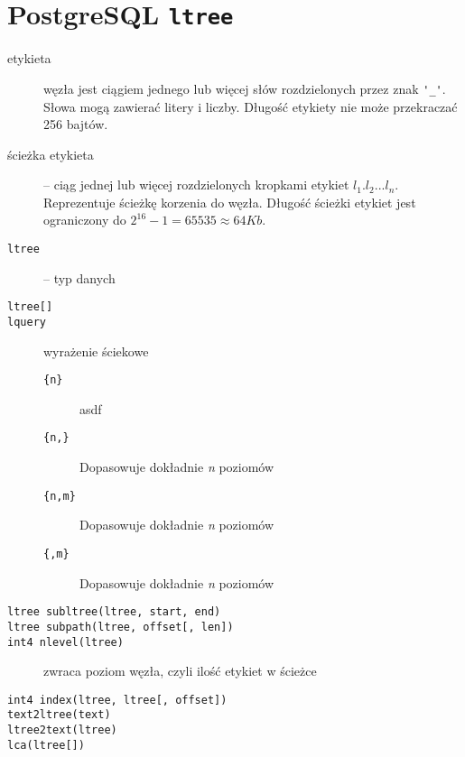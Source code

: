 \section{PostgreSQL \texttt{ltree}}



\begin{description}
    \item[etykieta]  węzła jest ciągiem jednego lub więcej słów rozdzielonych przez znak \verb|'_'|. 
        Słowa mogą zawierać litery i liczby.
        Długość etykiety nie może przekraczać 256 bajtów. 
    \item[ścieżka etykieta]
         -- ciąg jednej lub więcej rozdzielonych kropkami etykiet $l_1.l_2...l_n$. 
        Reprezentuje ścieżkę korzenia do węzła. 
        Długość ścieżki etykiet jest ograniczony do $2^{16} - 1 = 65535 \approx 64 Kb$. 
          

\end{description}


\begin{description}
    \item[\texttt{ltree}] -- typ danych
    \item[\texttt{ltree[]}]
    \item[\texttt{lquery}] wyrażenie ściekowe
    \begin{description}
        \item[\texttt{\{n\}}] asdf
        \item[\texttt{\{n,\}}] Dopasowuje dokładnie \emph{n} poziomów
        \item[\texttt{\{n,m\}}] Dopasowuje dokładnie \emph{n} poziomów
        \item[\texttt{\{,m\}}] Dopasowuje dokładnie \emph{n} poziomów
    \end{description}
\end{description}


\begin{description}
    \item[\texttt{ltree subltree(ltree, start, end)}]
    \item[\texttt{ltree subpath(ltree, offset[, len])}]
    \item[\texttt{int4 nlevel(ltree)}] zwraca poziom węzła, czyli ilość etykiet w ścieżce
    \item[\texttt{int4 index(ltree, ltree[, offset])}]
    \item[\texttt{text2ltree(text)}]
    \item[\texttt{ltree2text(ltree)}]
    \item[\texttt{lca(ltree[])}]
\end{description}


